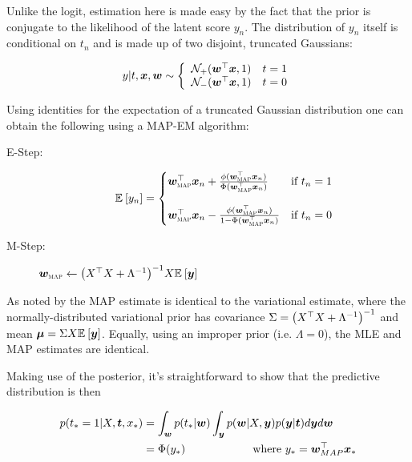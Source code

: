 Unlike the logit, estimation here is made easy by the fact that the prior is conjugate to the likelihood of the latent score $y_n$. The distribution of $y_n$ itself is conditional on $t_n$ and is made up of two disjoint, truncated Gaussians:

\begin{align}
y | t, \bm x, \bm w \sim \left\{ \begin{array}{lr} \mathcal{N}_+ (\bm w^\top\bm x, 1) & t = 1 \\
\mathcal{N}_- (\bm w^\top\bm x, 1) & t = 0
 \end{array} \right.
\end{align}

Using identities for the expectation of a truncated Gaussian distribution one can obtain the following using a MAP-EM algorithm\cite{Figueiredo2003}\cite{Armagan2011}:

\begin{description}
    \item[E-Step:]  \begin{equation*}
            \ex{y_n}{} = \left\{ \begin{matrix*}[l]
                \wmap\T\vv{x}_n + \frac{\phi(\wmap\T\vv{x}_n)}{\Phi(\wmap\T\vv{x}_n)} & \text{if } t_n = 1 \\
                \quad & \quad \\
                \wmap\T\vv{x}_n - \frac{\phi(\wmap\T\vv{x}_n)}{1 - \Phi(\wmap\T\vv{x}_n)} & \text{if } t_n = 0 
            \end{matrix*} \right.
        \end{equation*}
    \item[M-Step:] $\bm w_{\text{\tiny \sc MAP}} \leftarrow {\left( X ^\top X + \Lambda^{-1} \right)}^{-1}X\mathbb{E}_{ {  } }\left[ \bm y \right]$
\end{description}
As noted by \cite{Armagan2011} the MAP estimate is identical to the variational estimate, where the normally-distributed variational prior has covariance $\Sigma = {\left( X^\top X + \Lambda^{-1} \right)}^{-1}$ and mean $\bm \mu = \Sigma X \mathbb{E}_{ {  } }\left[ \bm y \right]$. Equally, using an improper prior (i.e. $\Lambda = 0$), the MLE and MAP estimates are identical.

Making use of the posterior, it's straightforward to show that the predictive distribution is then

\begin{align}
p(t_* = 1| X, \bm t, x_*) & = \int_{\bm w} p(t_* | \bm w)\int_{\bm y} p(\bm w| X, \bm y)p(\bm y|\bm t) d\bm y d\bm w \\
& = \Phi(y_*) \qquad \qquad \qquad \text{where }y_* = \bm w_{MAP}^\top\bm x_*
\end{align}

